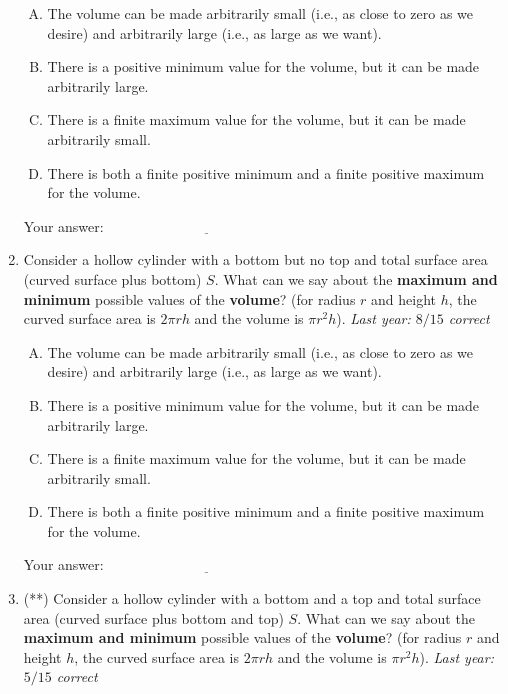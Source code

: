 \documentclass[10pt]{amsart}
\begin{document}
\begin{enumerate}
  \begin{enumerate}[(A)]
  \item The volume can be made arbitrarily small (i.e., as close to
    zero as we desire) and arbitrarily large (i.e., as large as we
    want).
  \item There is a positive minimum value for the volume, but it can
    be made arbitrarily large.
  \item There is a finite maximum value for the volume, but it can be
    made arbitrarily small.
  \item There is both a finite positive minimum and a finite positive
    maximum for the volume.
  \end{enumerate}

  \vspace{0.1in}
  Your answer: $\underline{\qquad\qquad\qquad\qquad\qquad\qquad\qquad}$
  \vspace{0.6in}

\item Consider a hollow cylinder with a bottom but no top and total
  surface area (curved surface plus bottom) $S$. What can we say about
  the {\bf maximum and minimum} possible values of the {\bf volume}?
  (for radius $r$ and height $h$, the curved surface area is $2\pi rh$
  and the volume is $\pi r^2h$). {\em Last year: $8/15$ correct}

  \begin{enumerate}[(A)]
  \item The volume can be made arbitrarily small (i.e., as close to
    zero as we desire) and arbitrarily large (i.e., as large as we
    want).
  \item There is a positive minimum value for the volume, but it can
    be made arbitrarily large.
  \item There is a finite maximum value for the volume, but it can be
    made arbitrarily small.
  \item There is both a finite positive minimum and a finite positive
    maximum for the volume.
  \end{enumerate}

  \vspace{0.1in}
  Your answer: $\underline{\qquad\qquad\qquad\qquad\qquad\qquad\qquad}$
  \vspace{0.6in}

\item (**) Consider a hollow cylinder with a bottom and a top and
  total surface area (curved surface plus bottom and top) $S$. What
  can we say about the {\bf maximum and minimum} possible values of
  the {\bf volume}?  (for radius $r$ and height $h$, the curved
  surface area is $2\pi rh$ and the volume is $\pi r^2h$). {\em Last
  year: $5/15$ correct}


\end{enumerate}
\end{document}
